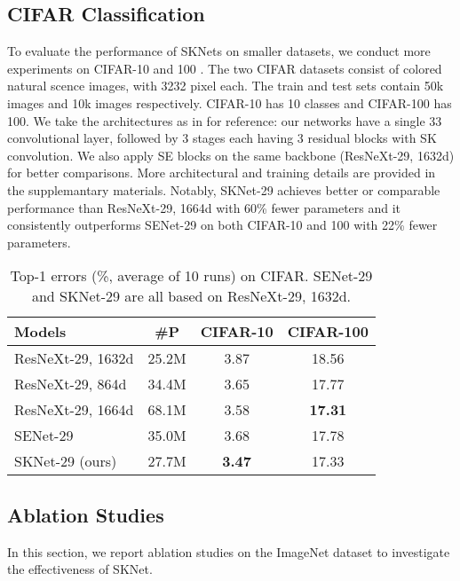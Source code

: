 \documentclass[10pt,twocolumn,letterpaper]{article}
\begin{document}
	\subsection{CIFAR Classification}
	To evaluate the performance of SKNets on smaller datasets, we conduct more experiments on CIFAR-10 and 100 \cite{krizhevsky2009learning}. The two CIFAR datasets \cite{krizhevsky2009learning} consist of colored natural scence images, with 3232 pixel each. The train and test sets contain 50k images and 10k images respectively. CIFAR-10 has 10 classes and CIFAR-100 has 100. We take the architectures as in \cite{xie2017aggregated} for reference: our networks have a single 33 convolutional layer, followed by 3 stages each having 3 residual blocks with SK convolution. We also apply SE blocks on the same backbone (ResNeXt-29, 1632d) for better comparisons. More architectural and training details are provided in the supplemantary materials. Notably, SKNet-29 achieves better or comparable performance than ResNeXt-29, 1664d with 60\% fewer parameters and it consistently outperforms SENet-29 on both CIFAR-10 and 100 with 22\% fewer parameters.
	\begin{table}
		\small
		\centering
		\renewcommand\arraystretch{1.1}
		\newcommand{\tabincell}[2]{\begin{tabular}{@{}#1@{}}#2\end{tabular}}
		\begin{tabular}{l|c|c|c}
			\hline

			Models& \#P & CIFAR-10 & CIFAR-100 \\
			\hline
			ResNeXt-29, 1632d &  25.2M & 3.87 & 18.56 \\
			ResNeXt-29, 864d  & 34.4M & 3.65 & 17.77  \\
			ResNeXt-29, 1664d  & 68.1M & 3.58 & \textbf{17.31} \\
			\hline
			SENet-29 \cite{hu2017squeeze} & 35.0M & 3.68 &  17.78 \\
			SKNet-29 (ours) & 27.7M & \textbf{3.47} & 17.33\\
			\hline
		\end{tabular}
		\vspace{+4pt}
		\caption{Top-1 errors (\%, average of 10 runs) on CIFAR. SENet-29 and SKNet-29 are all based on ResNeXt-29, 1632d. }
		\label{tab_cifar}
		\vspace{-2pt}
	\end{table}
	
	
	\subsection{Ablation Studies}
	\label{sec_ablation_imagenet}
	In this section, we report ablation studies on the ImageNet dataset to investigate the effectiveness of SKNet. 
	
\end{document}
